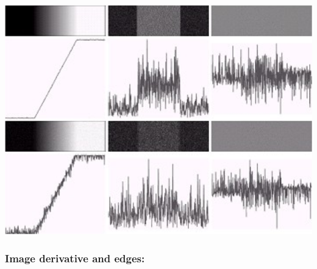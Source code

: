 \begin{center}
\includegraphics[width=\textwidth]{edge-noises.png}
\end{center}
\subsubsection{Image derivative and edges:}
